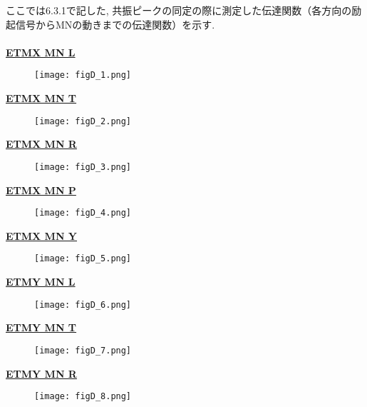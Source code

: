ここでは6.3.1で記した, 共振ピークの同定の際に測定した伝達関数（各方向の励起信号からMNの動きまでの伝達関数）を示す. \\\\
\noindent
\underline{{\bf ETMX MN L}}
\begin{figure}[H]
\begin{center}
\texttt{[image: figD\_1.png]}
\end{center}
\end{figure}
\noindent
\underline{{\bf ETMX MN T}}
\begin{figure}[H]
\begin{center}
\texttt{[image: figD\_2.png]}
\end{center}
\end{figure}
\clearpage
\noindent
\underline{{\bf ETMX MN R}}
\begin{figure}[H]
\begin{center}
\texttt{[image: figD\_3.png]}
\end{center}
\end{figure}
\noindent
\underline{{\bf ETMX MN P}}
\begin{figure}[H]
\begin{center}
\texttt{[image: figD\_4.png]}
\end{center}
\end{figure}
\noindent
\underline{{\bf ETMX MN Y}}
\begin{figure}[H]
\begin{center}
\texttt{[image: figD\_5.png]}
\end{center}
\end{figure}
\clearpage
\noindent
\underline{{\bf ETMY MN L}}
\begin{figure}[H]
\begin{center}
\texttt{[image: figD\_6.png]}
\end{center}
\end{figure}
\noindent
\underline{{\bf ETMY MN T}}
\begin{figure}[H]
\begin{center}
\texttt{[image: figD\_7.png]}
\end{center}
\end{figure}
\noindent
\underline{{\bf ETMY MN R}}
\begin{figure}[H]
\begin{center}
\texttt{[image: figD\_8.png]}
\end{center}
\end{figure}

